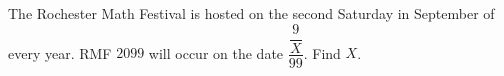 The Rochester Math Festival is hosted on the second Saturday in September of every year. RMF $2099$ will occur on the date $\dfrac{\dfrac{9}{X}}{99}$. Find $X$.
